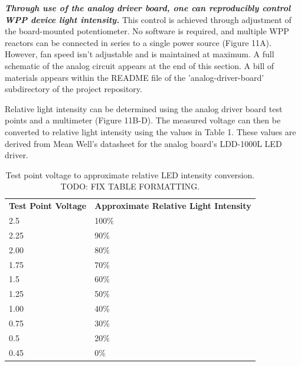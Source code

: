 \documentclass[11pt]{article}
\begin{document}
\textbf{\textit{Through use of the analog driver board, one can reproducibly control WPP device light intensity.}}
This control is achieved through adjustment of the board-mounted potentiometer.
No software is required, and multiple WPP reactors can be connected in series to a single power source (Figure 11A).
However, fan speed isn’t adjustable and is maintained at maximum.
A full schematic of the analog circuit appears at the end of this section.
A bill of materials appears within the README file of the 'analog-driver-board' subdirectory of the project repository.

Relative light intensity can be determined using the analog driver board test points and a multimeter (Figure 11B-D).
The measured voltage can then be converted to relative light intensity using the values in Table 1.
These values are derived from Mean Well's datasheet for the analog board’s LDD-1000L LED driver.

\begin{table}[H]
	\centering
	\begin{tabular}{ll}
		\centering
		\textbf{Test Point Voltage} & \textbf{Approximate Relative Light Intensity} \\
		2.5                         & 100\%                                         \\
		2.25                        & 90\%                                          \\
		2.00                        & 80\%                                          \\
		1.75                        & 70\%                                          \\
		1.5                         & 60\%                                          \\
		1.25                        & 50\%                                          \\
		1.00                        & 40\%                                          \\
		0.75                        & 30\%                                          \\
		0.5                         & 20\%                                          \\
		0.45                        & 0\%
	\end{tabular}
	\caption{Test point voltage to approximate relative LED intensity conversion. TODO: FIX TABLE FORMATTING.}
	\label{tab:analog-board-conversion}
\end{table}
\end{document}

